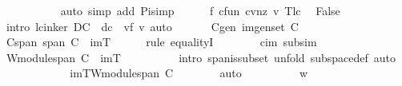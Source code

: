 \begin{isabellebody}
\ \ \ \ \ \ \ \ \ \isamarkupfalse%
\ {\isacharparenleft}auto\ simp\ add{\isacharcolon}\ Pi{\isacharunderscore}simp{\isacharparenright}\isanewline
\ \ \ \ \isamarkupfalse%
\ f\ c{\isacharprime}fun\ cvnz\ v{\isacharprime}\ T{\isacharunderscore}lc{\isacharunderscore}{}\ \isamarkupfalse%
\ False\isanewline
\ \ \ \ \ \ \isamarkupfalse%
\ {\isacharparenleft}intro\ lc{\isacharunderscore}in{\isacharunderscore}ker{\isacharbrackleft}\ {\isacharquery}D{\isacharequal}{\isachardoublequoteopen}C{\isachardoublequoteclose}\ \ {\isacharquery}d{\isacharequal}{\isachardoublequoteopen}{\isacharquery}c{\isachardoublequoteclose}\ \ {\isacharquery}v{\isacharequal}{\isachardoublequoteopen}{\isacharquery}f\ v{\isacharprime}{\isachardoublequoteclose}{\isacharbrackright}{\isacharcomma}\ auto{\isacharparenright}\isanewline
\ \ \isamarkupfalse%
\isanewline
\ \ \isamarkupfalse%
\ C{\isacharprime}{\isacharunderscore}gen{\isacharcolon}\ {\isachardoublequoteopen}im{\isachardot}gen{\isacharunderscore}set\ {\isacharquery}C{\isacharprime}{\isachardoublequoteclose}\isanewline
\ \ \isamarkupfalse%
\ {\isacharminus}\ \isanewline
\ \ \ \ \isamarkupfalse%
\ C{\isacharprime}{\isacharunderscore}span{\isacharcolon}\ {\isachardoublequoteopen}span\ {\isacharquery}C{\isacharprime}\ {\isacharequal}\ imT{\isachardoublequoteclose}\isanewline
\ \ \ \ \isamarkupfalse%
\ {\isacharparenleft}rule\ equalityI{\isacharparenright}\isanewline
\ \ \ \ \ \ \isamarkupfalse%
\ cim\ subs{\isacharunderscore}im\ \isamarkupfalse%
\ {\isachardoublequoteopen}W{\isachardot}module{\isachardot}span\ {\isacharquery}C{\isacharprime}\ {\isasymsubseteq}\ imT{\isachardoublequoteclose}\isanewline
\ \ \ \ \ \ \ \ \isamarkupfalse%
\ {\isacharparenleft}intro\ span{\isacharunderscore}is{\isacharunderscore}subset{\isacharcomma}\ unfold\ subspace{\isacharunderscore}def{\isacharcomma}\ auto{\isacharparenright}\isanewline
\ \ \ \ \isamarkupfalse%
\isanewline
\ \ \ \ \ \ \isamarkupfalse%
\ {\isachardoublequoteopen}imT{\isasymsubseteq}W{\isachardot}module{\isachardot}span\ {\isacharquery}C{\isacharprime}{\isachardoublequoteclose}\isanewline
\ \ \ \ \ \ \isamarkupfalse%
\ {\isacharparenleft}auto{\isacharparenright}\isanewline
\ \ \ \ \ \ \ \ \isamarkupfalse%
\ w\isanewline
\ \ \ \ \ \ \ \ \isamarkupfalse%

\end{isabellebody}
